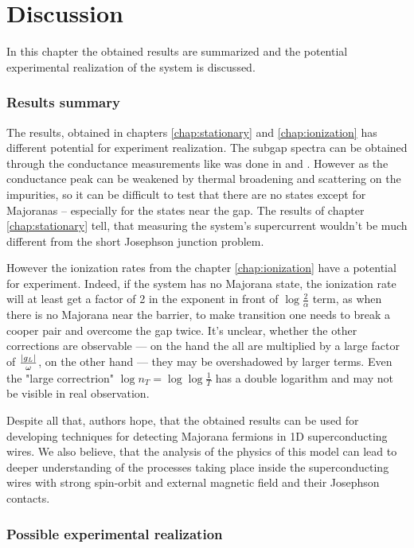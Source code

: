 \chapter{Discussion} 
\label{chap:discssion}
In this chapter the obtained results are summarized and the potential experimental realization of the system is discussed. 
\subsection{Results summary}
The results, obtained in chapters \ref{chap:stationary} and \ref{chap:ionization} has different potential for experiment realization. The subgap spectra can be obtained through the conductance measurements like was done in \cite{majorana_experiment_Kouwenhoven} and \cite{majorana_experiment_Zhang}. However as the conductance peak can be weakened by thermal broadening and scattering on the impurities, so it can be difficult to test that there are no states except for Majoranas -- especially for the states near the gap. The results of chapter \ref{chap:stationary} tell, that measuring the system's supercurrent wouldn't be much different from the short Josephson junction problem.

However the ionization rates from the chapter \ref{chap:ionization} have a potential for experiment. Indeed, if the system has no Majorana state, the ionization rate will at least get a factor of 2 in the exponent in front of $ \log\frac{2}{\alpha} $ term, as when there is no Majorana near the barrier, to make transition one needs to break a cooper pair and overcome the gap twice. It's unclear, whether the other corrections are observable --- on the hand the all are multiplied by a large factor of $ \frac{\left|g_L\right|}{\omega} $, on the other hand --- they may be overshadowed by larger terms. Even the "large correctrion" $ \log n_T = \log \log \frac{1}{T} $ has a double logarithm and may not be visible in real observation.

Despite all that, authors hope, that the obtained results can be used for developing techniques for detecting Majorana fermions in 1D superconducting wires. We also believe, that the analysis of the physics of this model can lead to deeper understanding of the processes taking place inside the superconducting wires with strong spin-orbit and external magnetic field and their Josephson contacts.

\subsection{Possible experimental realization}


